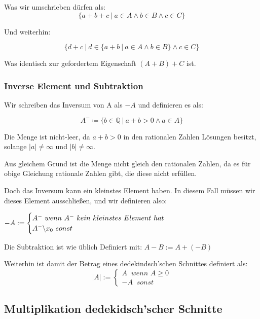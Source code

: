 \documentclass[12pt]{article}
\begin{document}
    Was wir umschrieben dürfen als:
    \[\{a+b+c \mspace{4mu} | \mspace{4mu} a \in A \land b \in B \land c \in C\}\]

    Und weiterhin:

    \[\{d+c \mspace{4mu} | \mspace{4mu} d \in \{a + b \mspace{4mu} | \mspace{4mu} a \in A \land b \in B\} \land c \in C\}\]

    Was identisch zur gefordertem Eigenschaft $(A + B) + C$ ist.


    \subsubsection{Inverse Element und Subtraktion}

    Wir schreiben das Inversum von A als $-A$ und definieren es als:

    \[A^- \coloneqq \{b \in \mathbb{Q} \mspace{4mu} | \mspace{4mu} a + b > 0 \land a \in A\}\]

    Die Menge ist nicht-leer, da $a + b > 0$ in den rationalen Zahlen Lösungen besitzt, solange $|a| \not = \infty$ und
    $|b| \not = \infty$.

    Aus gleichem Grund ist die Menge nicht gleich den rationalen Zahlen, da es für obige Gleichung rationale Zahlen gibt,
    die diese nicht erfüllen.

    Doch das Inversum kann ein kleinstes Element haben. In diesem Fall müssen wir dieses Element ausschließen,
    und wir definieren also:

    $-A := \begin{cases}A^- \mspace{6mu} wenn \mspace{6mu} A^- \mspace{6mu} kein \mspace{6mu} kleinstes \mspace{6mu} Element \mspace{6mu} hat \\A^- \symbol{'134} {x_0} \mspace{6mu} sonst\end{cases}$

    Die Subtraktion ist wie üblich Definiert mit:
    $A - B := A + (-B)$

    Weiterhin ist damit der Betrag eines dedekindsch'schen Schnittes definiert als:
    \[|A| := \begin{cases}A \mspace{10mu} wenn \mspace{6mu} A \ge 0 \\ -A \mspace{10mu} sonst\end{cases}\]

    \subsection{Multiplikation dedekidsch'scher Schnitte}
\end{document}
